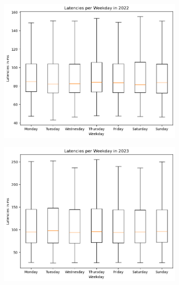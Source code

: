 \begin{figure}
	\centering
	\begin{subfigure}[b]{0.32\linewidth}
		\includegraphics[width=\linewidth]{chapters/4-results/latency/img/latency_2022_weekdays.png}
	\end{subfigure}
	\begin{subfigure}[b]{0.32\linewidth}
		\includegraphics[width=\linewidth]{chapters/4-results/latency/img/latency_2023_weekdays.png}
	\end{subfigure}
	\begin{subfigure}[b]{0.32\linewidth}

\end{subfigure}
\end{figure}
